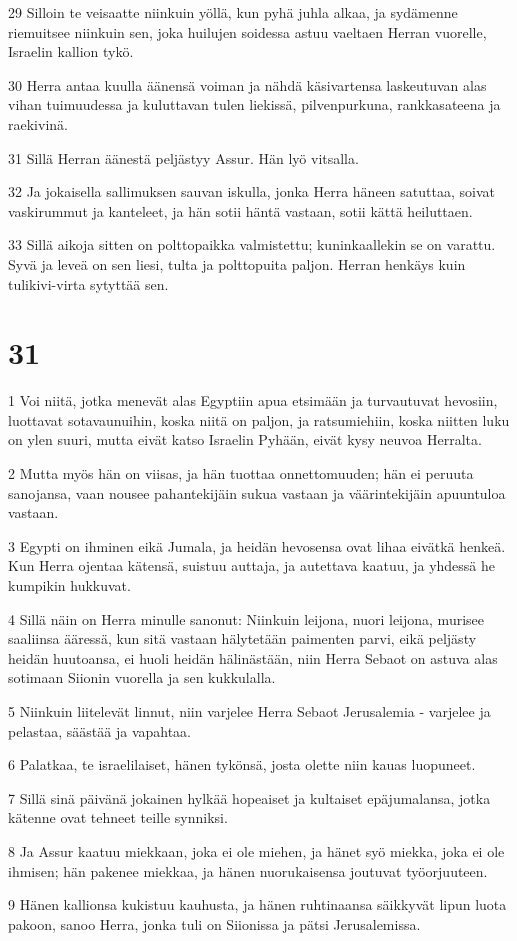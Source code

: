 \par 29 Silloin te veisaatte niinkuin yöllä, kun pyhä juhla alkaa, ja sydämenne riemuitsee niinkuin sen, joka huilujen soidessa astuu vaeltaen Herran vuorelle, Israelin kallion tykö.
\par 30 Herra antaa kuulla äänensä voiman ja nähdä käsivartensa laskeutuvan alas vihan tuimuudessa ja kuluttavan tulen liekissä, pilvenpurkuna, rankkasateena ja raekivinä.
\par 31 Sillä Herran äänestä peljästyy Assur. Hän lyö vitsalla.
\par 32 Ja jokaisella sallimuksen sauvan iskulla, jonka Herra häneen satuttaa, soivat vaskirummut ja kanteleet, ja hän sotii häntä vastaan, sotii kättä heiluttaen.
\par 33 Sillä aikoja sitten on polttopaikka valmistettu; kuninkaallekin se on varattu. Syvä ja leveä on sen liesi, tulta ja polttopuita paljon. Herran henkäys kuin tulikivi-virta sytyttää sen.

\chapter{31}

\par 1 Voi niitä, jotka menevät alas Egyptiin apua etsimään ja turvautuvat hevosiin, luottavat sotavaunuihin, koska niitä on paljon, ja ratsumiehiin, koska niitten luku on ylen suuri, mutta eivät katso Israelin Pyhään, eivät kysy neuvoa Herralta.
\par 2 Mutta myös hän on viisas, ja hän tuottaa onnettomuuden; hän ei peruuta sanojansa, vaan nousee pahantekijäin sukua vastaan ja väärintekijäin apuuntuloa vastaan.
\par 3 Egypti on ihminen eikä Jumala, ja heidän hevosensa ovat lihaa eivätkä henkeä. Kun Herra ojentaa kätensä, suistuu auttaja, ja autettava kaatuu, ja yhdessä he kumpikin hukkuvat.
\par 4 Sillä näin on Herra minulle sanonut: Niinkuin leijona, nuori leijona, murisee saaliinsa ääressä, kun sitä vastaan hälytetään paimenten parvi, eikä peljästy heidän huutoansa, ei huoli heidän hälinästään, niin Herra Sebaot on astuva alas sotimaan Siionin vuorella ja sen kukkulalla.
\par 5 Niinkuin liitelevät linnut, niin varjelee Herra Sebaot Jerusalemia - varjelee ja pelastaa, säästää ja vapahtaa.
\par 6 Palatkaa, te israelilaiset, hänen tykönsä, josta olette niin kauas luopuneet.
\par 7 Sillä sinä päivänä jokainen hylkää hopeaiset ja kultaiset epäjumalansa, jotka kätenne ovat tehneet teille synniksi.
\par 8 Ja Assur kaatuu miekkaan, joka ei ole miehen, ja hänet syö miekka, joka ei ole ihmisen; hän pakenee miekkaa, ja hänen nuorukaisensa joutuvat työorjuuteen.
\par 9 Hänen kallionsa kukistuu kauhusta, ja hänen ruhtinaansa säikkyvät lipun luota pakoon, sanoo Herra, jonka tuli on Siionissa ja pätsi Jerusalemissa.


